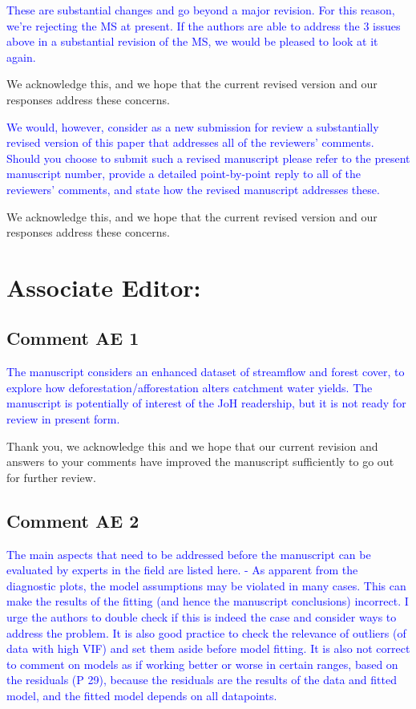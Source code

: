 \documentclass[]{elsarticle} %
\begin{document}
\begin{itemize}
\end{itemize}

\textcolor{blue}{These are substantial changes and go beyond a major revision.  For this reason, we're rejecting the MS at present.  If the authors are able to address the 3 issues above in a substantial revision of the MS, we would be pleased to look at it again.}

We acknowledge this, and we hope that the current revised version and our responses address these concerns.

\textcolor{blue}{We would, however, consider as a new submission for review a substantially revised version of this paper that addresses all of the reviewers' comments.  Should you choose to submit such a revised manuscript please refer to the present manuscript number, provide a detailed point-by-point reply to all of the reviewers' comments, and state how the revised manuscript addresses these.}

We acknowledge this, and we hope that the current revised version and our responses address these concerns.

\hypertarget{associate-editor}{%
\section{Associate Editor:}\label{associate-editor}}

\hypertarget{comment-ae-1}{%
\subsection{Comment AE 1}\label{comment-ae-1}}

\textcolor{blue}{The manuscript considers an enhanced dataset of streamflow and forest cover, to explore how deforestation/afforestation alters catchment water yields. The manuscript is potentially of interest of the JoH readership, but it is not ready for review in present form.}

Thank you, we acknowledge this and we hope that our current revision and answers to your comments have improved the manuscript sufficiently to go out for further review.

\hypertarget{comment-ae-2}{%
\subsection{Comment AE 2}\label{comment-ae-2}}

\textcolor{blue}{The main aspects that need to be addressed before the manuscript can be evaluated by experts in the field are listed here. 
- As apparent from the diagnostic plots, the model assumptions may be violated in many cases. This can make the results of the fitting (and hence the manuscript conclusions) incorrect. I urge the authors to double check if this is indeed the case and consider ways to address the problem. It is also good practice to check the relevance of outliers (of data with high VIF) and set them aside before model fitting. It is also not correct to comment on models as if working better or worse in certain ranges, based on the residuals (P 29), because the residuals are the results of the data and fitted model, and the fitted model depends on all datapoints.}
\end{document}
